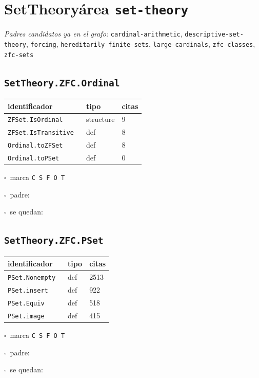 \documentclass[10pt,a4paper]{article}
\begin{document}
\section{SetTheory\hfill{\normalsize\normalfont área \texttt{set-theory}}}
\begin{sloppypar}\noindent\small\textit{Padres candidatos ya en el grafo:} \texttt{cardinal-arithmetic}, \texttt{descriptive-set-theory}, \texttt{forcing}, \texttt{hereditarily-finite-sets}, \texttt{large-cardinals}, \texttt{zfc-classes}, \texttt{zfc-sets}\end{sloppypar}
\subsection*{\texttt{SetTheory.ZFC.Ordinal}}
\noindent\begin{minipage}{0.56\linewidth}\small\begin{tabular}{@{}>{\raggedright\arraybackslash}p{0.58\linewidth}ll@{}}\toprule
identificador & tipo & citas\\\midrule
\texttt{ZFSet.\allowbreak{}IsOrdinal} & structure & 9\\
\texttt{ZFSet.\allowbreak{}IsTransitive} & def & 8\\
\texttt{Ordinal.\allowbreak{}toZFSet} & def & 8\\
\texttt{Ordinal.\allowbreak{}toPSet} & def & 0\\
\bottomrule\end{tabular}\end{minipage}\hfill\begin{minipage}{0.40\linewidth}\small$\square$~marca \texttt{C S F O T}\par\smallskip$\square$~padre: \dotfill\par\smallskip$\square$~se quedan: \dotfill\par\end{minipage}\par\medskip
\subsection*{\texttt{SetTheory.ZFC.PSet}}
\noindent\begin{minipage}{0.56\linewidth}\small\begin{tabular}{@{}>{\raggedright\arraybackslash}p{0.58\linewidth}ll@{}}\toprule
identificador & tipo & citas\\\midrule
\texttt{PSet.\allowbreak{}Nonempty} & def & 2513\\
\texttt{PSet.\allowbreak{}insert} & def & 922\\
\texttt{PSet.\allowbreak{}Equiv} & def & 518\\
\texttt{PSet.\allowbreak{}image} & def & 415\\
\bottomrule\end{tabular}\end{minipage}\hfill\begin{minipage}{0.40\linewidth}\small$\square$~marca \texttt{C S F O T}\par\smallskip$\square$~padre: \dotfill\par\smallskip$\square$~se quedan: \dotfill\par\end{minipage}\par\medskip
\end{document}
